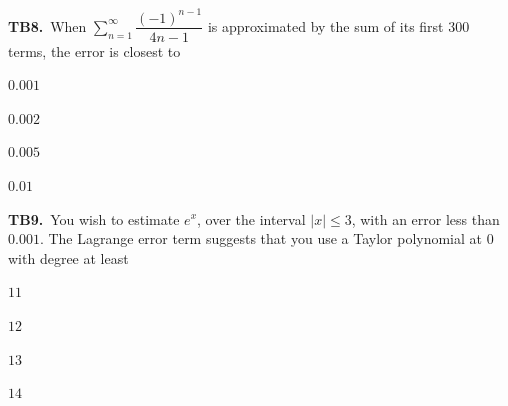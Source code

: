 \documentclass[11pt]{article}
\begin{document}
\bigskip\noindent\textbf{TB8.}\ When $\displaystyle\sum_{n=1}^\infty \dfrac{(-1)^{n-1}}{4n-1}$ is approximated by the sum of its first 300 terms, the error is closest to
\begin{list}{}{\setlength{\leftmargin}{3em}\setlength{\labelwidth}{2.5em}\setlength{\itemsep}{0pt}\setlength{\topsep}{2pt}}
\item[(A)] $0.001$
\item[(B)] $0.002$
\item[(C)] $0.005$
\item[(D)] $0.01$
\end{list}

\bigskip\noindent\textbf{TB9.}\ You wish to estimate $e^x$, over the interval $|x|\leq 3$, with an error less than $0.001$. The Lagrange error term suggests that you use a Taylor polynomial at 0 with degree at least
\begin{list}{}{\setlength{\leftmargin}{3em}\setlength{\labelwidth}{2.5em}\setlength{\itemsep}{0pt}\setlength{\topsep}{2pt}}
\item[(A)] $11$
\item[(B)] $12$
\item[(C)] $13$
\item[(D)] $14$
\end{list}
\end{document}
